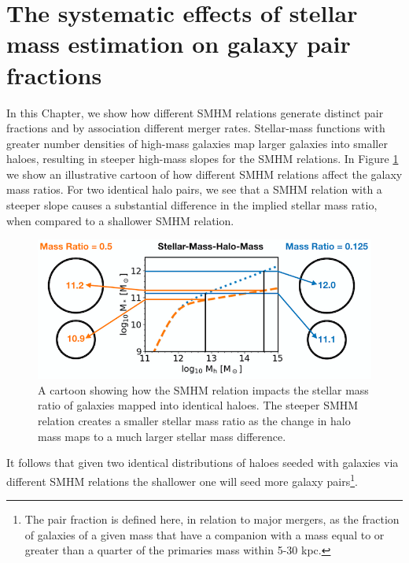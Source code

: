\section{The systematic effects of stellar mass estimation on galaxy pair fractions}


In this Chapter, we show how different SMHM relations generate distinct pair fractions and by association different merger rates. 
Stellar-mass functions with greater number densities of high-mass galaxies map larger galaxies into smaller haloes, resulting in steeper high-mass slopes for the SMHM relations.
In Figure \ref{fig:MassRatioCartoon} we show an illustrative cartoon of how different SMHM relations affect the galaxy mass ratios. 
For two identical halo pairs, we see that a SMHM relation with a steeper slope causes a substantial difference in the implied stellar mass ratio, when compared to a shallower SMHM relation. 

\begin{figure}[h]
    \centering
    \includegraphics[width = \linewidth]{Figures/Chapter5/MassRatioCartoon.png}
    \caption{A cartoon showing how the SMHM relation impacts the stellar mass ratio of galaxies mapped into identical haloes. The steeper SMHM relation creates a smaller stellar mass ratio as the change in halo mass maps to a much larger stellar mass difference.}
    \label{fig:MassRatioCartoon}
\end{figure}

It follows that given two identical distributions of haloes seeded with galaxies via different SMHM relations the shallower one will seed more galaxy pairs\footnote{The pair fraction is defined here, in relation to major mergers, as the fraction of galaxies of a given mass that have a companion with a mass equal to or greater than a quarter of the primaries mass within 5-30 kpc.}.

